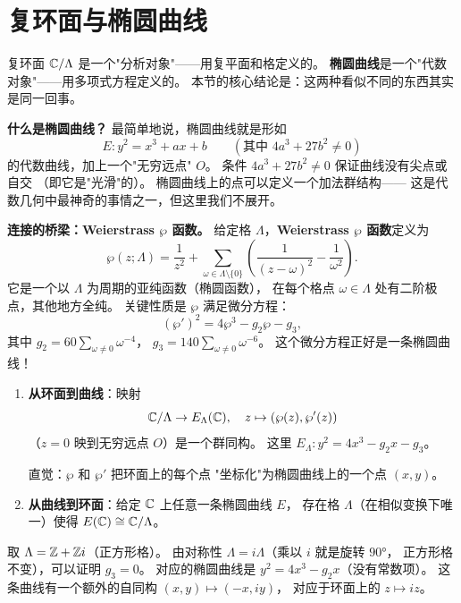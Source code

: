 \section{复环面与椭圆曲线}
\label{sec:tori-and-ec}

复环面 $\mathbb{C}/\Lambda$ 是一个"分析对象"——用复平面和格定义的。
\textbf{椭圆曲线}是一个"代数对象"——用多项式方程定义的。
本节的核心结论是：这两种看似不同的东西其实是同一回事。

\textbf{什么是椭圆曲线？}
最简单地说，椭圆曲线就是形如
\[
  E\colon y^2 = x^3 + ax + b \qquad (\text{其中 } 4a^3 + 27b^2 \neq 0)
\]
的代数曲线，加上一个"无穷远点" $O$。
条件 $4a^3 + 27b^2 \neq 0$ 保证曲线没有尖点或自交
（即它是"光滑"的）。
椭圆曲线上的点可以定义一个加法群结构——
这是代数几何中最神奇的事情之一，但这里我们不展开。

\textbf{连接的桥梁：Weierstrass $\wp$ 函数。}
给定格 $\Lambda$，\textbf{Weierstrass $\wp$ 函数}定义为
\[
  \wp(z;\Lambda) = \frac{1}{z^2} + \sum_{\omega \in \Lambda \setminus \{0\}}
  \left(\frac{1}{(z-\omega)^2} - \frac{1}{\omega^2}\right).
\]
它是一个以 $\Lambda$ 为周期的亚纯函数（椭圆函数），
在每个格点 $\omega \in \Lambda$ 处有二阶极点，其他地方全纯。
关键性质是 $\wp$ 满足微分方程：
\[
  (\wp')^2 = 4\wp^3 - g_2\wp - g_3,
\]
其中 $g_2 = 60\sum_{\omega \neq 0} \omega^{-4}$，
$g_3 = 140\sum_{\omega \neq 0} \omega^{-6}$。
这个微分方程正好是一条椭圆曲线！

\begin{theorem}[均匀化定理]
\label{thm:uniformization}
\leavevmode
\begin{enumerate}
  \item \textbf{从环面到曲线}：映射
    \[
      \mathbb{C}/\Lambda \to E_\Lambda(\mathbb{C}), \quad
      z \mapsto (\wp(z), \wp'(z))
    \]
    （$z = 0$ 映到无穷远点 $O$）是一个群同构。
    这里 $E_\Lambda\colon y^2 = 4x^3 - g_2 x - g_3$。
    
    直觉：$\wp$ 和 $\wp'$ 把环面上的每个点
    "坐标化"为椭圆曲线上的一个点 $(x,y)$。

  \item \textbf{从曲线到环面}：给定 $\mathbb{C}$ 上任意一条椭圆曲线 $E$，
    存在格 $\Lambda$（在相似变换下唯一）使得
    $E(\mathbb{C}) \cong \mathbb{C}/\Lambda$。
\end{enumerate}
\end{theorem}

\begin{example}[正方形格对应的椭圆曲线]
\label{ex:square-lattice-curve}
取 $\Lambda = \mathbb{Z} + \mathbb{Z} i$（正方形格）。
由对称性 $\Lambda = i\Lambda$（乘以 $i$ 就是旋转 $90°$，
正方形格不变），可以证明 $g_3 = 0$。
对应的椭圆曲线是 $y^2 = 4x^3 - g_2 x$（没有常数项）。
这条曲线有一个额外的自同构 $(x,y) \mapsto (-x, iy)$，
对应于环面上的 $z \mapsto iz$。
\end{example}


